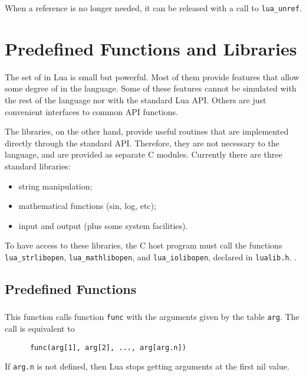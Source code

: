 When a reference is no longer needed,
it can be released with a call to \verb|lua_unref|.



\section{Predefined Functions and Libraries}

The set of  in Lua is small but powerful.
Most of them provide features that allow some degree of
 in the language.
Some of these features cannot be simulated with the rest of the
language nor with the standard Lua API.
Others are just convenient interfaces to common API functions.

The libraries, on the other hand, provide useful routines
that are implemented directly through the standard API.
Therefore, they are not necessary to the language,
and are provided as separate C modules.
Currently there are three standard libraries:
\begin{itemize}
\item string manipulation;
\item mathematical functions (sin, log, etc);
\item input and output (plus some system facilities).
\end{itemize}
To have access to these libraries,
the C host program must call the functions
\verb|lua_strlibopen|, \verb|lua_mathlibopen|,
and \verb|lua_iolibopen|, declared in \verb|lualib.h|.
.


\subsection{Predefined Functions} \label{predefined}

\subsubsection*{\ff {}}
\label{pdf-call}
This function calls function \verb|func| with
the arguments given by the table \verb|arg|.
The call is equivalent to
\begin{verbatim}
      func(arg[1], arg[2], ..., arg[arg.n])
\end{verbatim}
If \verb|arg.n| is not defined,
then Lua stops getting arguments at the first nil value.

